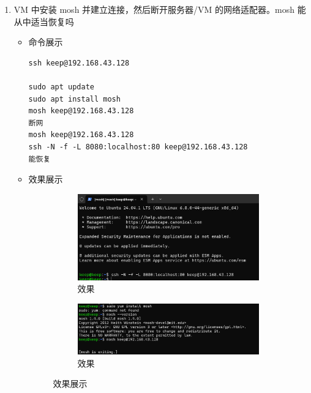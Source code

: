 \documentclass[UTF8]{ctexart}
\begin{document}
\begin{enumerate}
  \item VM 中安装 mosh 并建立连接，然后断开服务器/VM 的网络适配器。mosh 能从中适当恢复吗
  \begin{itemize}
  \item 命令展示
  \begin{verbatim}
ssh keep@192.168.43.128

sudo apt update
sudo apt install mosh
mosh keep@192.168.43.128
断网
mosh keep@192.168.43.128
ssh -N -f -L 8080:localhost:80 keep@192.168.43.128
能恢复
  \end{verbatim}
\item 效果展示
 \begin{figure}[H]
    \centering
    \begin{subfigure}[b]{0.48\textwidth}
        \includegraphics[width=\textwidth]{121} %
        \caption{效果}
        \label{fig:left}
    \end{subfigure}
    \hfill
    \begin{subfigure}[b]{0.48\textwidth}
        \includegraphics[width=\textwidth]{122} %
        \caption{效果}
        \label{fig:right}
    \end{subfigure}
    \caption{效果展示}
    \label{fig:side_by_side}
\end{figure}
  \end{itemize}
\end{enumerate}

\end{document}
